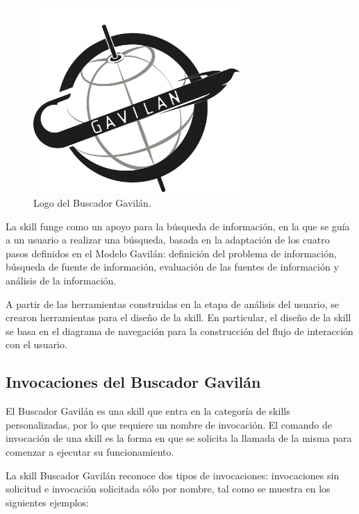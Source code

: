 \begin{figure}
  \centering
  \includegraphics[width=0.70\textwidth]{Cap4/Figuras/LogoSkill.png}
  \caption{Logo del Buscador Gavilán.}
  \label{fig:423}
\end{figure}

La skill funge como un apoyo para la búsqueda de información, en la que se guía a un usuario a realizar una búsqueda, basada en la adaptación de los cuatro pasos definidos en el Modelo Gavilán: definición del problema de información, búsqueda de fuente de información, evaluación de las fuentes de información y análisis de la información.

A partir de las herramientas construidas en la etapa de análisis del usuario, se crearon herramientas para el diseño de la skill. En particular, el diseño de la skill se basa en el diagrama de navegación para la construcción del flujo de interacción con el usuario.


\subsection{Invocaciones del Buscador Gavilán}
\label{InvocacionesBuscadorGavilancapIV}

El Buscador Gavilán es una skill que entra en la categoría de skills personalizadas, por lo que requiere un nombre de invocación. El comando de invocación de una skill es la forma en que se solicita la llamada de la misma para comenzar a ejecutar su funcionamiento.

La skill Buscador Gavilán reconoce dos tipos de invocaciones: invocaciones sin solicitud e invocación solicitada sólo por nombre, tal como se muestra en los siguientes ejemplos:

